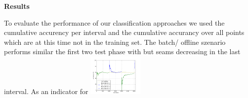 \begin{center} \textbf{\huge Results} \end{center}
To evaluate the performance of our classification approaches we used the cumulative accurency per interval and the cumulative accurancy over all points which are at this time not in the training set. The batch/ offline szenario performs similar the first two test phase with but seams decreasing in the last interval. As an indicator for 
 \includegraphics[width=0.2\textwidth]{./plots/batchPlot.png} 
